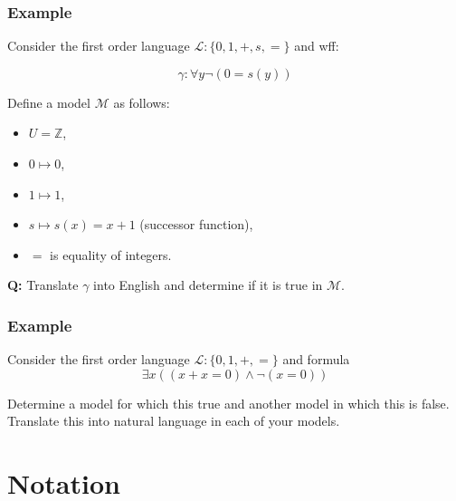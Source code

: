 \documentclass{beamer}
\theoremstyle{indentDefn} \newtheorem{defn}[]{Definition}
\begin{document}
\begin{frame}
	\frametitle{Example}
	
	Consider the first order language $\mathcal{L}: \{0,1,+,s,=\}$ and wff: 
	
	$$ \gamma: \forall y \lnot(0 = s(y))$$
	
	\vspace{0.3cm}
	
	Define a model $\mathcal{M}$ as follows:
	\begin{itemize}
		\item[] $U = \mathbb{Z}$,
		\item[] $0 \mapsto 0$,
		\item[] $1 \mapsto 1$,
		\item[] $s \mapsto s(x) = x+1$ (successor function),
		\item[] $=$ is equality of integers.
	\end{itemize}
	
	\vspace{0.3cm}
	
	{\bf Q:} Translate $\gamma$ into English and determine if it is true in $\mathcal{M}$. 	
\end{frame}

\begin{frame}
	\frametitle{Example}
	
	Consider the first order language $\mathcal{L}: \{0,1,+,=\}$ and formula 
	$$ \exists x ((x + x = 0) \land \lnot(x = 0))$$
	
	\vspace{0.5cm} 
	
	Determine a model for which this true and another model in which this is false. Translate this into natural language in each of your models. 
	
	
\end{frame}

\section{Notation}
\end{document}
